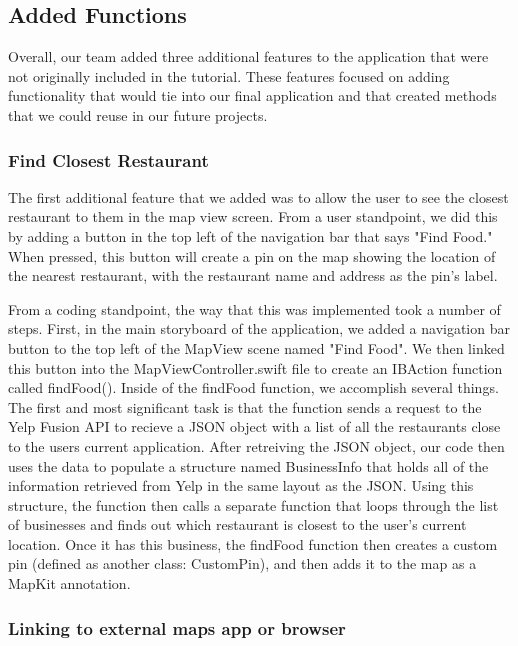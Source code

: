 \documentclass[conference]{IEEEtran}
\begin{document}
\subsection{Added Functions}
Overall, our team added three additional features to the application that were not 
originally included in the tutorial. These features focused on adding functionality
that would tie into our final application and that created methods that we could
reuse in our future projects.

\subsubsection{Find Closest Restaurant}
The first additional feature that we added was to allow the user to see the closest
restaurant to them in the map view screen. From a user standpoint, we did this by 
adding a button in the top left of the navigation bar that says "Find Food." When 
pressed, this button will create a pin on the map showing the location of the nearest
restaurant, with the restaurant name and address as the pin's label.

From a coding standpoint, the way that this was implemented took a number of steps.
First, in the main storyboard of the application, we added a navigation bar button
to the top left of the MapView scene named "Find Food". We then linked this button
into the MapViewController.swift file to create an IBAction function called findFood().
Inside of the findFood function, we accomplish several things. The first and 
most significant task is that the function sends a request to the Yelp Fusion API
to recieve a JSON object with a list of all the restaurants close to the users current
application. After retreiving the JSON object, our code then uses the data to populate
a structure named BusinessInfo that holds all of the information retrieved from Yelp
in the same layout as the JSON. Using this structure, the function then calls a separate
function that loops through the list of businesses and finds out which restaurant
is closest to the user's current location. Once it has this business, the findFood
function then creates a custom pin (defined as another class: CustomPin), and then
adds it to the map as a MapKit annotation.

\subsubsection{Linking to external maps app or browser}
\end{document}
